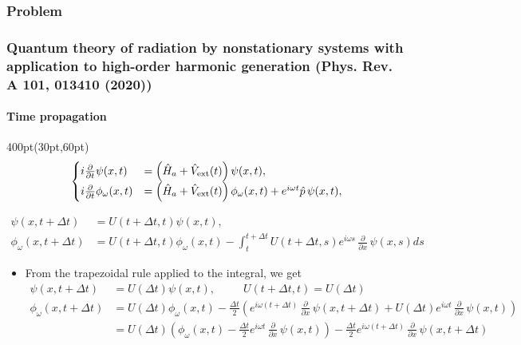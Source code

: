 \begin{frame}
\frametitle{Problem}
\frametitle{Quantum theory of radiation by nonstationary systems 
	with application to high-order harmonic generation
        (Phys. Rev. A 101, 013410 (2020))}
	\framesubtitle{Time propagation}


\begin{textblock*}{400pt}(30pt,60pt)
\footnotesize
\begin{align}
\begin{cases}
	i\frac{\partial}{\partial t}\psi(x,t)
	   & = \left( \hat{H}_a + \hat{V}_{\rm ext}(t)\right) 
	   \psi(x,t),\\
	i\frac{\partial}{\partial t}\phi_\omega(x,t)
	   & = \left( \hat{H}_a + \hat{V}_{\rm ext}(t)\right) 
	   \phi_\omega (x,t)
 	   + e^{i\omega t} {\hat{p}}\,
	   \psi(x,t), \nonumber
\end{cases}
\end{align}


\begin{align}
\psi(x,t+\Delta t)
& = U(t+\Delta t,t)\psi(x,t),      \nonumber\\
\phi_\omega(x,t + \Delta t)
 & = U(t+\Delta t,t)
   \phi_\omega(x,t) 
  - \int_{t}^{t+\Delta t} U(t+\Delta t,s) e^{i\omega s}\,\frac{\partial}{\partial x}\,\psi(x,s)ds  \nonumber
\end{align}                                                            
\begin{itemize}
\item From the trapezoidal rule applied to the integral, we get
\begin{align}                                                            
\psi(x,t+\Delta t)
& = U(\Delta t)\psi(x,t),   \hspace{30pt} U(t+\Delta t,t) = U(\Delta t)   \\
\phi_\omega(x,t + \Delta t)  
  & = U(\Delta t)\phi_\omega(x,t)   -  \frac{\Delta t}{2}
\left(e^{i\omega (t+\Delta t)}\,\frac{\partial}{\partial x}\,\psi(x,t+\Delta t)  + U(\Delta t) e^{i\omega t}\,\frac{\partial}{\partial x}\,\psi(x,t) \right) \\
  & = U(\Delta t)\left(\phi_\omega(x,t)   
-  \frac{\Delta t}{2}
e^{i\omega t}\,\frac{\partial}{\partial x}\,\psi(x,t)\right) 
-\frac{\Delta t}{2} e^{i\omega (t+\Delta t)}\,\frac{\partial}{\partial x}\,
       \psi(x,t+\Delta t) 
\end{align}                                                            
\end{itemize}
\end{textblock*}                                                       
                                                                      
\end{frame}                                                          







